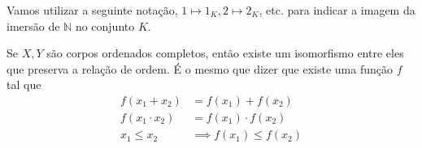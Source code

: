 \documentclass[../main.tex]{subfiles}
\begin{document}
Vamos utilizar a seguinte notação, $1 \mapsto 1_K, 2 \mapsto 2_K$, etc. para indicar a imagem da imersão de $\mathbb{N}$ no conjunto $K$.

\begin{teo}\label{enum-teo-RUnico}
    Se $X,Y$ são corpos ordenados completos, então existe um isomorfismo entre eles que preserva a relação de ordem. É o mesmo que dizer que existe uma função $f$ tal que
    \begin{align}
         f(x_1 + x_2) &= f(x_1) + f(x_2) \label{enum-teoDummy-isoSoma}\\
         f(x_1 \cdot x_2) &= f(x_1) \cdot f(x_2) \label{enum-teoDummy-isoProduto} \\
         x_1 \leq x_2 &\implies f(x_1) \leq f(x_2) \label{enum-teoDummy-isoOrdem}
    \end{align}
\end{teo}
\end{document}
